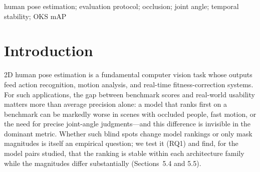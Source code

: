 \documentclass[10pt,conference]{IEEEtran}
\begin{document}
\begin{abstract}
transformer pair's jump rate significantly lower than the YOLO pair's under the shared protocol, and the smoothing-domain finding replicates across architectures. Correlation analysis shows that stratified mAP is highly consistent with full mAP (sign-consistency $\tau_s=1.0$, 12/12 pairs)---its value lies in magnitude diagnosis rather than re-ranking---while the angle metrics' difference vectors, particularly knee angle, do not fully align with the full-mAP ranking, suggesting they carry partially independent information (descriptive $n=6$, Section~5.4). The protocol and harness are open-sourced and positioned as a complement to, not a replacement for, OKS-mAP.
\end{abstract}

\begin{IEEEkeywords}
human pose estimation; evaluation protocol; occlusion; joint angle; temporal stability; OKS mAP
\end{IEEEkeywords}

\section{Introduction}

2D human pose estimation is a fundamental computer vision task whose outputs feed action recognition, motion analysis, and real-time fitness-correction systems. For such applications, the gap between benchmark scores and real-world usability matters more than average precision alone: a model that ranks first on a benchmark can be markedly worse in scenes with occluded people, fast motion, or the need for precise joint-angle judgments---and this difference is invisible in the dominant metric. Whether such blind spots change model rankings or only mask magnitudes is itself an empirical question; we test it (RQ1) and find, for the model pairs studied, that the ranking is stable within each architecture family while the magnitudes differ substantially (Sections~5.4 and 5.5).
\end{document}
